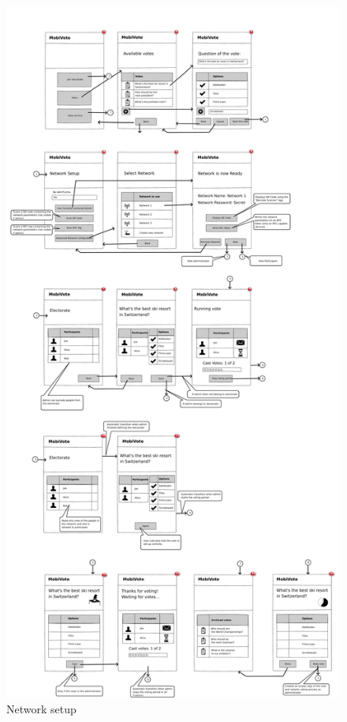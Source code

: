 \documentclass[numbers=noenddot, abstract=on, a4paper, headsepline,
footsepline, oneside, draft=off]{scrreprt}
\begin{document}
\begin{figure}[htbp]
	\centering
	\includegraphics[height=.4\textheight]{img/network_setup}
	\caption{Network setup}
	\label{fig:network_setup}
\end{figure}
\end{document}
